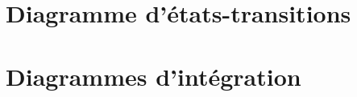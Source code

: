 \section{Diagramme d'états-transitions}

\section{Diagrammes d'intégration}







































